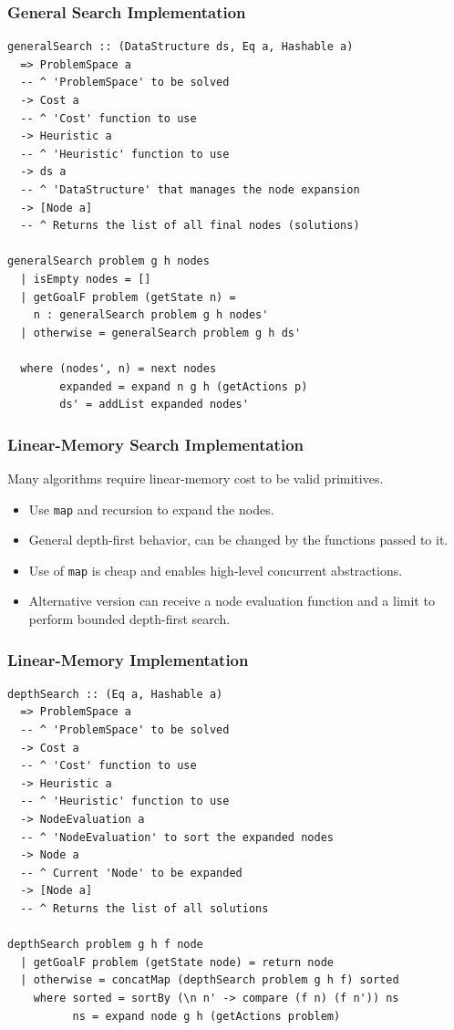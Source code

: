 \documentclass{beamer}
\begin{document}
\begin{frame}[fragile]
  \frametitle{General Search Implementation}
\begin{lstlisting}[style=haskell]
generalSearch :: (DataStructure ds, Eq a, Hashable a)
  => ProblemSpace a
  -- ^ 'ProblemSpace' to be solved
  -> Cost a
  -- ^ 'Cost' function to use
  -> Heuristic a
  -- ^ 'Heuristic' function to use
  -> ds a
  -- ^ 'DataStructure' that manages the node expansion
  -> [Node a]
  -- ^ Returns the list of all final nodes (solutions)

generalSearch problem g h nodes
  | isEmpty nodes = []
  | getGoalF problem (getState n) =
    n : generalSearch problem g h nodes'
  | otherwise = generalSearch problem g h ds'

  where (nodes', n) = next nodes
        expanded = expand n g h (getActions p)
        ds' = addList expanded nodes'
\end{lstlisting}
\end{frame}

\begin{frame}
  \frametitle{Linear-Memory Search Implementation}
  Many algorithms require linear-memory cost to be valid primitives.
  \begin{itemize}
  \item Use \texttt{map} and recursion to expand the nodes.
  \item General depth-first behavior, can be changed by the functions passed to
    it.
  \item Use of \texttt{map} is cheap and enables high-level concurrent
    abstractions.
  \item Alternative version can receive a node evaluation function and a limit
    to perform bounded depth-first search.
  \end{itemize}
\end{frame}

\begin{frame}[fragile]
  \frametitle{Linear-Memory Implementation}
\begin{lstlisting}[style=haskell]
depthSearch :: (Eq a, Hashable a)
  => ProblemSpace a
  -- ^ 'ProblemSpace' to be solved
  -> Cost a
  -- ^ 'Cost' function to use
  -> Heuristic a
  -- ^ 'Heuristic' function to use
  -> NodeEvaluation a
  -- ^ 'NodeEvaluation' to sort the expanded nodes
  -> Node a
  -- ^ Current 'Node' to be expanded
  -> [Node a]
  -- ^ Returns the list of all solutions

depthSearch problem g h f node
  | getGoalF problem (getState node) = return node
  | otherwise = concatMap (depthSearch problem g h f) sorted
    where sorted = sortBy (\n n' -> compare (f n) (f n')) ns
          ns = expand node g h (getActions problem)
\end{lstlisting}
\end{frame}
\end{document}

